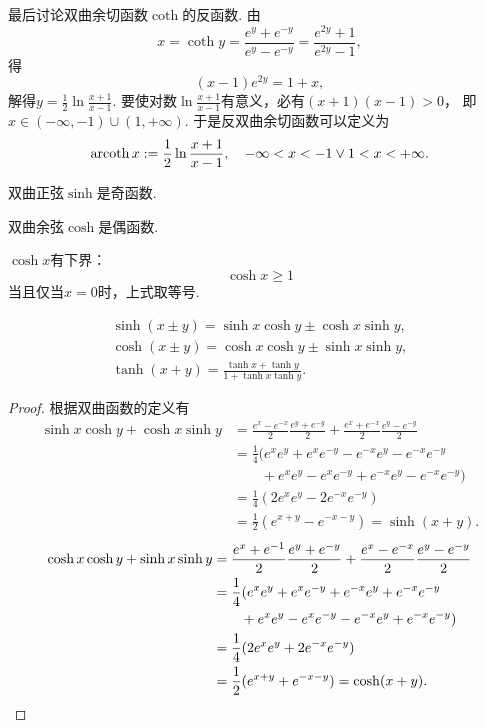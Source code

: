 最后讨论双曲余切函数\(\coth\)的反函数.
由\[
	x = \coth y
	= \frac{e^y+e^{-y}}{e^y-e^{-y}}
	= \frac{e^{2y}+1}{e^{2y}-1},
\]得\[
	(x-1) e^{2y} = 1+x,
\]
解得\(y = \frac12 \ln\frac{x+1}{x-1}\).
要使对数\(\ln\frac{x+1}{x-1}\)有意义，必有\((x+1)(x-1)>0\)，
即\(x\in(-\infty,-1)\cup(1,+\infty)\).
于是反双曲余切函数可以定义为\[
	\operatorname{arcoth} x
	:=
	\frac12 \ln\frac{x + 1}{x - 1},
	\quad -\infty<x<-1\lor1<x<+\infty.
\]

\begin{property}
双曲正弦\(\sinh\)是奇函数.
\end{property}

\begin{property}
双曲余弦\(\cosh\)是偶函数.
\end{property}

\begin{property}
\(\cosh x\)有下界：\[
	\cosh x \geq 1
\]
当且仅当\(x=0\)时，上式取等号.
\end{property}

\begin{theorem}
\begin{gather}
	\sinh(x \pm y) = \sinh x\cosh y \pm \cosh x\sinh y, \\
	\cosh(x \pm y) = \cosh x\cosh y \pm \sinh x\sinh y, \\
	\tanh(x + y) = \frac{\tanh x + \tanh y}{1 + \tanh x\tanh y}.
\end{gather}
\begin{proof}
根据双曲函数的定义有
\begin{align*}
	\sinh x\cosh y+\cosh x\sinh y
	&= \frac{e^x - e^{-x}}{2} \frac{e^y + e^{-y}}{2}
		+ \frac{e^x + e^{-x}}{2} \frac{e^y - e^{-y}}{2} \\
	&= \frac{1}{4} (e^x e^y + e^x e^{-y} - e^{-x} e^y - e^{-x} e^{-y} \\
	&\qquad+ e^x e^y - e^x e^{-y} + e^{-x} e^y - e^{-x} e^{-y}) \\
	&= \frac{1}{4} (2 e^x e^y - 2 e^{-x} e^{-y}) \\
	&= \frac12 (e^{x+y} - e^{-x-y}) = \sinh(x+y).
\end{align*}
\begin{align*}
	\cosh x\cosh y+\sinh x\sinh y
	&= \frac{e^x + e^{-1}}{2} \frac{e^y + e^{-y}}{2}
		+ \frac{e^x - e^{-x}}{2} \frac{e^y - e^{-y}}{2} \\
	&= \frac{1}{4} (e^x e^y + e^x e^{-y} + e^{-x} e^y + e^{-x} e^{-y} \\
	&\qquad+ e^x e^y - e^x e^{-y} - e^{-x} e^y + e^{-x} e^{-y}) \\
	&= \frac{1}{4} (2 e^x e^y + 2 e^{-x} e^{-y}) \\
	&= \frac12 (e^{x+y} + e^{-x-y}) = \cosh(x+y).
	\qedhere
\end{align*}
\end{proof}
\end{theorem}

